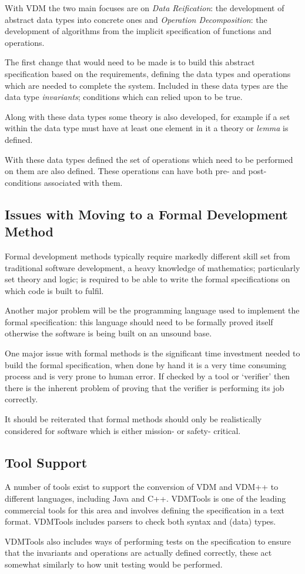 \documentclass[a4paper, notitlepage, fleqn]{article}
\begin{document}
With VDM the two main focuses are on \emph{Data Reification}: the development of abstract data 
types into concrete ones and \emph{Operation Decomposition}: the development of algorithms from
the implicit specification of functions and operations.

The first change that would need to be made is to build this abstract specification based on the
requirements, defining the data types and operations which are needed to complete the system.
Included in these data types are the data type \emph{invariants}; conditions which can relied 
upon to be true.

Along with these data types some theory is also developed, for example if a set within the data
type must have at least one element in it a theory or \emph{lemma} is defined.

With these data types defined the set of operations which need to be performed on them are also
defined. These operations can have both pre- and post- conditions associated with them.


\subsection*{Issues with Moving to a Formal Development Method}
Formal development methods typically require markedly different skill set from traditional 
software development, a heavy knowledge of mathematics; particularly set theory and logic; is
required to be able to write the formal specifications on which code is built to fulfil.

Another major problem will be the programming language used to implement the formal specification:
this language should need to be formally proved itself otherwise the software is being built on an
unsound base.

One major issue with formal methods is the significant time investment needed to build the formal 
specification, when done by hand it is a very time consuming process and is very prone to human
error. If checked by a tool or `verifier' then there is the inherent problem of proving that the
verifier is performing its job correctly.

It should be reiterated that formal methods should only be realistically considered for software
which is either mission- or safety- critical.


\subsection*{Tool Support}
A number of tools exist to support the conversion of VDM and VDM++ to different languages, 
including Java and C++. VDMTools is one of the leading commercial tools for this area and involves
defining the specification in a text format. VDMTools includes parsers to check both syntax and 
(data) types.

VDMTools also includes ways of performing tests on the specification to ensure that the invariants
and operations are actually defined correctly, these act somewhat similarly to how unit testing
would be performed.




\end{document}
